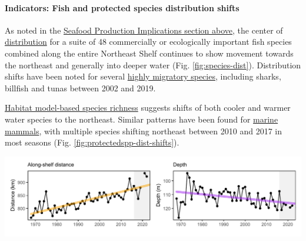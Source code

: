 \documentclass[
  10pt,
]{article}
\let\origfigure\figure
\let\endorigfigure\endfigure
\renewenvironment{figure}[1][2] {
    \expandafter\origfigure\expandafter[H]
} {
    \endorigfigure
}
\begin{document}
\paragraph{Indicators: Fish and protected species distribution shifts}\label{indicators-fish-and-protected-species-distribution-shifts}

As noted in the \hyperref[implications]{Seafood Production Implications section above}, the center of \href{https://noaa-edab.github.io/catalog/species_dist.html}{distribution} for a suite of 48 commercially or ecologically important fish species combined along the entire Northeast Shelf continues to show movement towards the northeast and generally into deeper water (Fig. \ref{fig:species-dist}). Distribution shifts have been noted for several \href{https://noaa-edab.github.io/catalog/species_dist.html}{highly migratory species}, including sharks, billfish and tunas between 2002 and 2019.

\href{https://noaa-edab.github.io/catalog/habitat_diversity.html}{Habitat model-based species richness} suggests shifts of both cooler and warmer water species to the northeast. Similar patterns have been found for \href{https://noaa-edab.github.io/catalog/cetacean_dist.html}{marine mammals}, with multiple species shifting northeast between 2010 and 2017 in most seasons (Fig. \ref{fig:protectedspp-dist-shifts}).

\begin{figure}

{\centering \includegraphics{midatlantic_files/figure-latex/species-dist-1} 

}

\caption{Aggregate species distribution metrics for species in the Northeast Large Marine Ecosystem: along shelf distance with increasing trend (orange), and depth with decreasing trend indicating deeper water (purple).}\label{fig:species-dist}
\end{figure}
\end{document}
